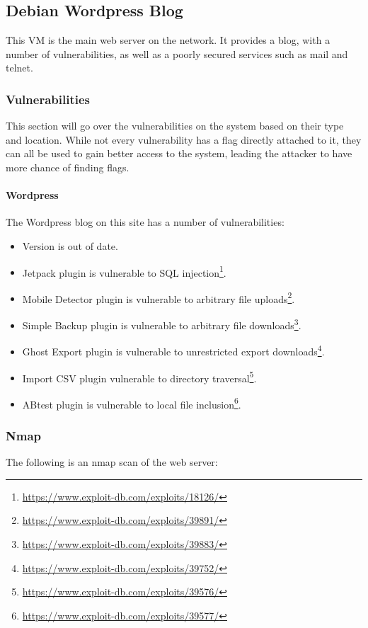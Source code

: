 		\subsection{Debian Wordpress Blog}
			This VM is the main web server on the network. 
			It provides a blog, with a number of vulnerabilities, as well as a poorly secured services such as mail and telnet. 


			\subsubsection{Vulnerabilities}
				This section will go over the vulnerabilities on the system based on their type and location. 
				While not every vulnerability has a flag directly attached to it, they can all be used to gain better access to the system, leading the attacker to have more chance of finding flags. 
				\paragraph{Wordpress}
					The Wordpress blog on this site has a number of vulnerabilities:
						\begin{itemize}
							\item Version is out of date.
							\item Jetpack plugin is vulnerable to SQL injection\footnote{\url{https://www.exploit-db.com/exploits/18126/}}.
							\item Mobile Detector plugin is vulnerable to arbitrary file uploads\footnote{\url{https://www.exploit-db.com/exploits/39891/}}.
							\item Simple Backup plugin is vulnerable to arbitrary file downloads\footnote{\url{https://www.exploit-db.com/exploits/39883/}}.
							\item Ghost Export plugin is vulnerable to unrestricted export downloads\footnote{\url{https://www.exploit-db.com/exploits/39752/}}.
							\item Import CSV plugin vulnerable to directory traversal\footnote{\url{https://www.exploit-db.com/exploits/39576/}}.
							\item ABtest plugin is vulnerable to local file inclusion\footnote{\url{https://www.exploit-db.com/exploits/39577/}}.
						\end{itemize}
					
			\subsubsection{Nmap}
				The following is an nmap scan of the web server:
				



